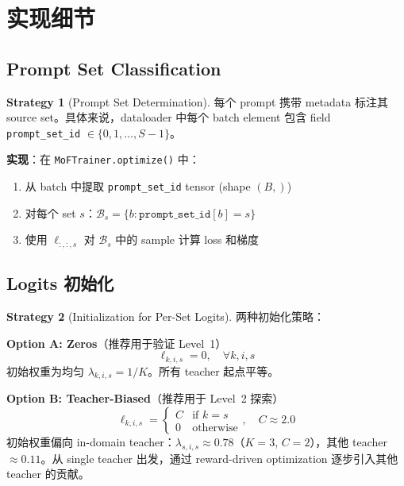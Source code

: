 \documentclass[11pt,a4paper]{article}
\theoremstyle{definition}
\newtheorem{strategy}{Strategy}
\begin{document}
\section{实现细节}
\label{sec:implementation}

\subsection{Prompt Set Classification}

\begin{strategy}[Prompt Set Determination]
\label{strat:classify}
每个 prompt 携带 metadata 标注其 source set。具体来说，dataloader 中每个 batch element 包含 field \texttt{prompt\_set\_id} $\in \{0, 1, \ldots, S-1\}$。

\textbf{实现}：在 \texttt{MoFTrainer.optimize()} 中：
\begin{enumerate}[leftmargin=1.5em]
\item 从 batch 中提取 \texttt{prompt\_set\_id} tensor (shape $(B,)$)
\item 对每个 set $s$：$\mathcal{B}_s = \{b : \texttt{prompt\_set\_id}[b] = s\}$
\item 使用 $\ell_{:,:,s}$ 对 $\mathcal{B}_s$ 中的 sample 计算 loss 和梯度
\end{enumerate}
\end{strategy}

\subsection{Logits 初始化}

\begin{strategy}[Initialization for Per-Set Logits]
\label{strat:init}
两种初始化策略：

\textbf{Option A: Zeros}（推荐用于验证 Level~1）
\begin{equation}
\ell_{k,i,s} = 0, \quad \forall k, i, s
\end{equation}
初始权重为均匀 $\lambda_{k,i,s} = 1/K$。所有 teacher 起点平等。

\textbf{Option B: Teacher-Biased}（推荐用于 Level~2 探索）
\begin{equation}
\ell_{k,i,s} = \begin{cases}
C & \text{if } k = s \\
0 & \text{otherwise}
\end{cases}, \quad C \approx 2.0
\end{equation}
初始权重偏向 in-domain teacher：$\lambda_{s,i,s} \approx 0.78$（$K=3$, $C=2$），其他 teacher $\approx 0.11$。从 single teacher 出发，通过 reward-driven optimization 逐步引入其他 teacher 的贡献。
\end{strategy}
\end{document}

